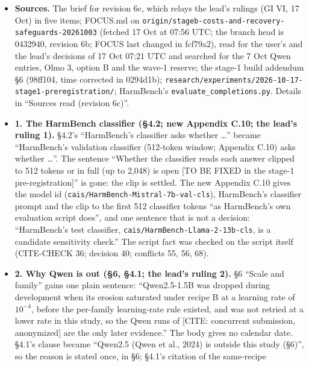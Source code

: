 \documentclass{article}
\theoremstyle{plain}
\theoremstyle{definition}
\theoremstyle{remark}
\begin{document}
\begin{itemize}
  \item \textbf{Sources.} The brief for revision 6c, which relays the lead's
        rulings (GI VI, 17 Oct) in five items; FOCUS.md on
        \nolinkurl{origin/stageb-costs-and-recovery-safeguards-20261003}
        (fetched 17 Oct at 07:56 UTC; the branch head is 0432940, revision 6b;
        FOCUS last changed in fcf79a2), read for the user's and the lead's
        decisions of 17 Oct 07:21 UTC and searched for the 7 Oct Qwen entries,
        Olmo 3, option B and the wave-1 reserve; the stage-1 build addendum
        \S{}6 (98ff104, time corrected in 0294d1b);
        \nolinkurl{research/experiments/2026-10-17-stage1-preregistration/};
        HarmBench's \nolinkurl{evaluate_completions.py}. Details in ``Sources
        read (revision 6c)''.
  \item \textbf{1. The HarmBench classifier (\S{}4.2; new Appendix C.10; the
        lead's ruling 1).} \S{}4.2's ``HarmBench's classifier asks whether
        \ldots{}'' became ``HarmBench's validation classifier (512-token window;
        Appendix C.10) asks whether \ldots{}''. The sentence ``Whether the
        classifier reads each answer clipped to 512 tokens or in full (up to
        2,048) is open [TO BE FIXED in the stage-1 pre-registration]'' is gone:
        the clip is settled. The new Appendix C.10 gives the model id
        (\nolinkurl{cais/HarmBench-Mistral-7b-val-cls}), HarmBench's classifier
        prompt and the clip to the first 512 classifier tokens ``as HarmBench's
        own evaluation script does'', and one sentence that is not a decision:
        ``HarmBench's test classifier,
        \nolinkurl{cais/HarmBench-Llama-2-13b-cls}, is a candidate sensitivity
        check.'' The script fact was checked on the script itself (CITE-CHECK
        36; decision 40; conflicts 55, 56, 68).
  \item \textbf{2. Why Qwen is out (\S{}6, \S{}4.1; the lead's ruling 2).} \S{}6
        ``Scale and family'' gains one plain sentence: ``Qwen2.5-1.5B was
        dropped during development when its erosion saturated under recipe B at
        a learning rate of $10^{-4}$, before the per-family learning-rate rule
        existed, and was not retried at a lower rate in this study, so the Qwen
        runs of [CITE: concurrent submission, anonymized] are the only later
        evidence.'' The body gives no calendar date. \S{}4.1's clause became
        ``Qwen2.5 (Qwen et al., 2024) is outside this study (\S{}6)'', so the
        reason is stated once, in \S{}6; \S{}4.1's citation of the same-recipe

\end{itemize}
\end{document}
